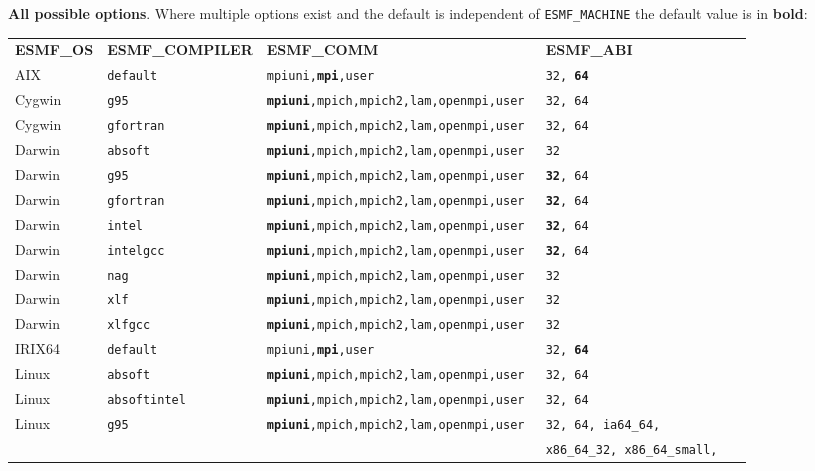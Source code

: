 \vspace{1ex}

{\bf All possible options}. Where multiple options exist 
and the default is independent of {\tt ESMF\_MACHINE} the default value is in {\bf bold}:

\vspace{1ex}


\begin{tabular}{lllll}
  {\bfseries\footnotesize ESMF\_OS} &{\bfseries\footnotesize ESMF\_COMPILER} & {\bfseries\footnotesize ESMF\_COMM} & {\bfseries\footnotesize ESMF\_ABI} \\

AIX     &\tt default     &\tt mpiuni,{\bf mpi},user      &\tt 32, {\bf 64} \\
Cygwin  &\tt g95         &\tt {\bf mpiuni},mpich,mpich2,lam,openmpi,user &\tt 32, 64 \\
Cygwin  &\tt gfortran    &\tt {\bf mpiuni},mpich,mpich2,lam,openmpi,user &\tt 32, 64 \\
Darwin  &\tt absoft      &\tt {\bf mpiuni},mpich,mpich2,lam,openmpi,user &\tt 32 \\
Darwin  &\tt g95         &\tt {\bf mpiuni},mpich,mpich2,lam,openmpi,user &\tt {\bf 32}, 64 \\
Darwin  &\tt gfortran    &\tt {\bf mpiuni},mpich,mpich2,lam,openmpi,user &\tt {\bf 32}, 64 \\
Darwin  &\tt intel       &\tt {\bf mpiuni},mpich,mpich2,lam,openmpi,user &\tt {\bf 32}, 64 \\
Darwin  &\tt intelgcc    &\tt {\bf mpiuni},mpich,mpich2,lam,openmpi,user &\tt {\bf 32}, 64 \\
Darwin  &\tt nag         &\tt {\bf mpiuni},mpich,mpich2,lam,openmpi,user &\tt 32 \\
Darwin  &\tt xlf         &\tt {\bf mpiuni},mpich,mpich2,lam,openmpi,user &\tt 32 \\
Darwin  &\tt xlfgcc      &\tt {\bf mpiuni},mpich,mpich2,lam,openmpi,user &\tt 32 \\
IRIX64  &\tt default     &\tt mpiuni,{\bf mpi},user     &\tt 32, {\bf 64} \\
Linux   &\tt absoft      &\tt {\bf mpiuni},mpich,mpich2,lam,openmpi,user &\tt 32, 64 \\
Linux   &\tt absoftintel &\tt {\bf mpiuni},mpich,mpich2,lam,openmpi,user &\tt 32, 64  \\
Linux   &\tt g95         &\tt {\bf mpiuni},mpich,mpich2,lam,openmpi,user &\tt 32, 64, ia64\_64, \\
        &                &                              &\tt x86\_64\_32, x86\_64\_small, \\

\end{tabular}
